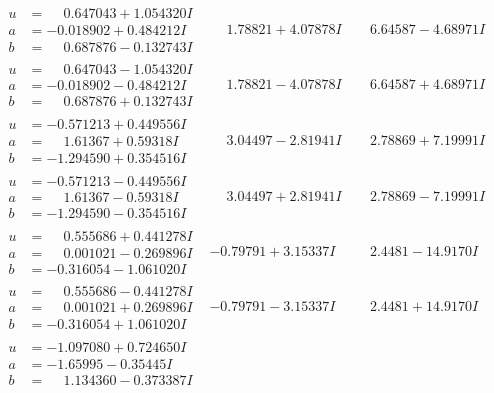 \documentclass[1p]{elsarticle_modified}
\theoremstyle{definition}
\begin{document}
$$\begin{array}{c|c|c}
\begin{aligned}
u &= \phantom{-}0.647043 + 1.054320 I \\
a &= -0.018902 + 0.484212 I \\
b &= \phantom{-}0.687876 - 0.132743 I\end{aligned}
 & \phantom{-}1.78821 + 4.07878 I & \phantom{-}6.64587 - 4.68971 I \\ \hline\begin{aligned}
u &= \phantom{-}0.647043 - 1.054320 I \\
a &= -0.018902 - 0.484212 I \\
b &= \phantom{-}0.687876 + 0.132743 I\end{aligned}
 & \phantom{-}1.78821 - 4.07878 I & \phantom{-}6.64587 + 4.68971 I \\ \hline\begin{aligned}
u &= -0.571213 + 0.449556 I \\
a &= \phantom{-}1.61367 + 0.59318 I \\
b &= -1.294590 + 0.354516 I\end{aligned}
 & \phantom{-}3.04497 - 2.81941 I & \phantom{-}2.78869 + 7.19991 I \\ \hline\begin{aligned}
u &= -0.571213 - 0.449556 I \\
a &= \phantom{-}1.61367 - 0.59318 I \\
b &= -1.294590 - 0.354516 I\end{aligned}
 & \phantom{-}3.04497 + 2.81941 I & \phantom{-}2.78869 - 7.19991 I \\ \hline\begin{aligned}
u &= \phantom{-}0.555686 + 0.441278 I \\
a &= \phantom{-}0.001021 - 0.269896 I \\
b &= -0.316054 - 1.061020 I\end{aligned}
 & -0.79791 + 3.15337 I & \phantom{-}2.4481 - 14.9170 I \\ \hline\begin{aligned}
u &= \phantom{-}0.555686 - 0.441278 I \\
a &= \phantom{-}0.001021 + 0.269896 I \\
b &= -0.316054 + 1.061020 I\end{aligned}
 & -0.79791 - 3.15337 I & \phantom{-}2.4481 + 14.9170 I \\ \hline\begin{aligned}
u &= -1.097080 + 0.724650 I \\
a &= -1.65995 - 0.35445 I \\
b &= \phantom{-}1.134360 - 0.373387 I\end{aligned}

\end{array}$$
\end{document}
